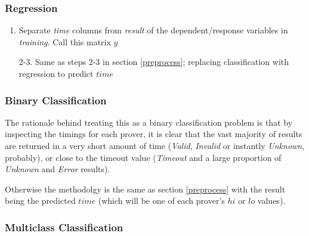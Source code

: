 \documentclass[]{article}
\begin{document}
\subsubsection{Regression}

\begin{enumerate}
\item{Separate \textit{time} columns from \textit{result} of the dependent/response variables in \textit{training}. Call this matrix $y$}
\item[2-3.]{Same as steps 2-3 in section \ref{preprocess}; replacing classification with regression to predict $time$}
\end{enumerate} 

\subsubsection{Binary Classification}
\label{binary}

The rationale behind treating this as a binary classification problem is that by inspecting the timings for each prover, it is clear that the vast majority of results are returned in a very short amount of time (\textit{Valid}, \textit{Invalid} or instantly \textit{Unknown}, probably), or close to the timeout value (\textit{Timeout} and a large proportion of \textit{Unknown} and \textit{Error} results).

\vspace{0.2in}

\noindent{}
\vspace{0.2in}

Otherwise the methodolgy is the same as section \ref{preprocess} with the result being the predicted $time$ (which will be one of each prover's $hi$ or $lo$ values).

\subsubsection{Multiclass Classification}
\end{document}
